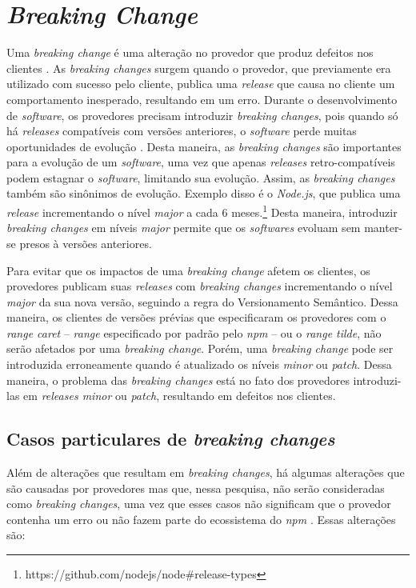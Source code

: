 \section{\textit{Breaking Change}}
\label{ref-teo:breaking_change}
Uma \textit{breaking change} é uma alteração no provedor que produz defeitos nos clientes \cite{teorical_reference:semver}. As \textit{breaking changes} surgem quando o provedor, que previamente era utilizado com sucesso pelo cliente, publica uma \textit{release} que causa no cliente um comportamento inesperado, resultando em um erro. Durante o desenvolvimento de \textit{software}, os provedores precisam introduzir \textit{breaking changes}, pois quando só há \textit{releases} compatíveis com versões anteriores, o \textit{software} perde muitas oportunidades de evolução \cite{teorical_reference:bc_2}. Desta maneira, as \textit{breaking changes} são importantes para a evolução de um \textit{software}, uma vez que apenas \textit{releases} retro-compatíveis podem estagnar o \textit{software}, limitando sua evolução. Assim, as \textit{breaking changes} também são sinônimos de evolução. Exemplo disso é o \textit{Node.js}, que publica uma \textit{release} incrementando o nível \textit{major} a cada 6 meses.\footnote{https://github.com/nodejs/node\#release-types} Desta maneira, introduzir \textit{breaking changes} em níveis \textit{major} permite que os \textit{softwares} evoluam sem manter-se presos à versões anteriores.

Para evitar que os impactos de uma \textit{breaking change} afetem os clientes, os provedores publicam suas \textit{releases} com \textit{breaking changes} incrementando o nível \textit{major} da sua nova versão, seguindo a regra do Versionamento Semântico. Dessa maneira, os clientes de versões prévias que especificaram os provedores com o \textit{range caret} -- \textit{range} especificado por padrão pelo \textit{npm} -- ou o \textit{range tilde}, não serão afetados por uma \textit{breaking change}. Porém, uma \textit{breaking change} pode ser introduzida erroneamente quando é atualizado os níveis \textit{minor} ou \textit{patch}. Dessa maneira, o problema das \textit{breaking changes} está no fato dos provedores introduzi-las em \textit{releases minor} ou \textit{patch}, resultando em defeitos nos clientes.

\subsection{Casos particulares de \textit{breaking changes}}
Além de alterações que resultam em \textit{breaking changes}, há algumas alterações que são causadas por provedores mas que, nessa pesquisa, não serão consideradas como \textit{breaking changes}, uma vez que esses casos não significam que o provedor contenha um erro ou não fazem parte do ecossistema do \textit{npm} . Essas alterações são:


